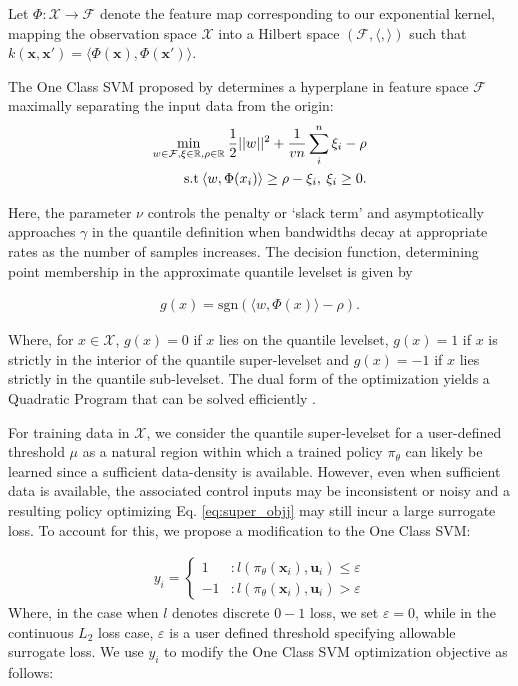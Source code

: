\documentclass[10pt, conference]{ieeeconf}      %
\newcommand{\bu}{\mathbf{u}}
\newcommand{\bx}{\mathbf{x}}
\begin{document}
Let $\Phi:\mathcal{X}\to \mathcal{F}$ denote the feature map corresponding to our exponential kernel, mapping the
observation space $\mathcal{X}$ into a Hilbert space $(\mathcal{F}, \langle, \rangle)$ such that $k(\bx, \bx') = \langle
\Phi(\bx), \Phi(\bx')\rangle$.

The One Class SVM proposed by \cite{scholkopf2001estimating} determines a hyperplane in feature space $\mathcal{F}$
maximally separating the input data from the origin:
\vspace{-2ex}
\begin{align}\label{eq:primal_sup}
    \underset{w\in \mathcal{F}, \mathbf{\xi} \in \mathbb{R}, \rho \in \mathbb{R}}{\mbox{min}}\: \frac{1}{2}||w||^2+\frac{1}{vn} \sum^n_i \xi_i - \rho\\
\mbox{s.t} \: \langle w,\Phi(x_i) \rangle \geq \rho - \xi_i, \: \xi_i \geq 0 \notag.
\end{align}

Here, the parameter $\nu$ controls the penalty or `slack term' and asymptotically approaches $\gamma$ \cite{vert2006consistency}
in the quantile definition when bandwidths decay at appropriate rates as the number of samples increases. The decision
function, determining point membership in the approximate quantile levelset is given by

\vspace{-2ex}
\begin{align}\label{eq:decision_func}
g(x) = \mbox{sgn}(\langle w,\Phi(x) \rangle-\rho).
\end{align}

Where, for $x\in \mathcal{X}$, $g(x)=0$ if $x$ lies on the quantile levelset,
$g(x) = 1$ if $x$ is strictly in the interior of the quantile super-levelset and $g(x) = -1$ 
if $x$ lies strictly in the quantile sub-levelset. The dual form of the optimization yields a Quadratic Program 
that can be solved efficiently \cite{scholkopf2001estimating}. 

For training data in $\mathcal{X}$, we consider the quantile super-levelset for a user-defined threshold $\mu$ as a natural region within which
a trained policy $\pi_{\theta}$ can likely be learned since a sufficient data-density is available.
However, even when sufficient data is available, the associated control inputs may be inconsistent or noisy and a resulting policy
optimizing Eq. \ref{eq:super_objj} may still incur a large surrogate loss. To account for this, we propose a
modification to the One Class SVM:

\begin{align}
y_i = \left\{
     \begin{array}{lr}
         1 & : l(\pi_{\theta}(\bx_i),\bu_i)\le \varepsilon\\
         -1 & : l(\pi_{\theta}(\bx_i),\bu_i)>\varepsilon
     \end{array}
   \right.
\end{align}
Where, in the case when $l$ denotes discrete $0-1$ loss, we set $\varepsilon = 0$, while in the continuous $L_2$ loss
case, $\varepsilon$ is a user defined threshold specifying allowable surrogate loss.
We use $y_i$ to modify the One Class SVM optimization objective as follows: 
\end{document}
